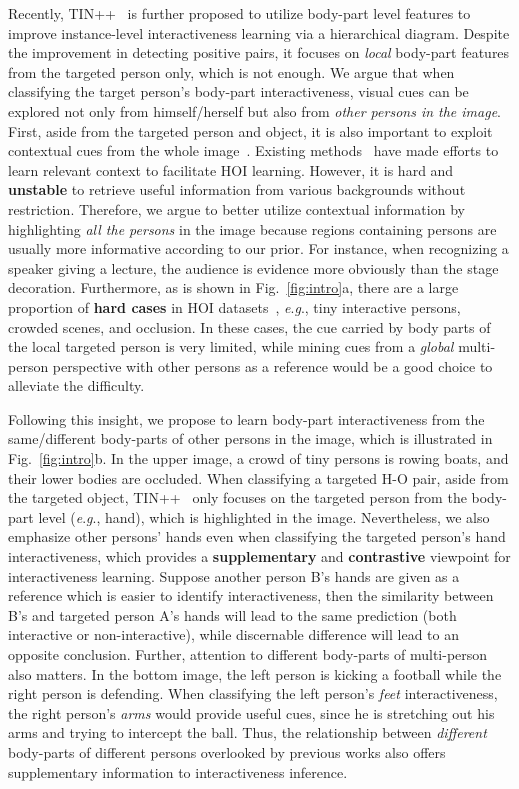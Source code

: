 \documentclass[runningheads]{llncs}
\newcommand{\eg}{\textit{e}.\textit{g}.}
\begin{document}
Recently, TIN++~\cite{li2021transferable} is further proposed to utilize body-part level features to improve instance-level interactiveness learning via a hierarchical diagram. Despite the improvement in detecting positive pairs, it focuses on \textit{local} body-part features from the targeted person only, which is not enough. We argue that when classifying the target person's body-part interactiveness, visual cues can be explored not only from himself/herself but also from \textit{other persons in the image}. 
First, aside from the targeted person and object, it is also important to exploit contextual cues from the whole image~\cite{gao2018ican}. 
Existing methods~\cite{gao2018ican,qpic} have made efforts to learn relevant context to facilitate HOI learning.
However, it is hard and \textbf{unstable} to retrieve useful information from various backgrounds without restriction. Therefore, we argue to better utilize contextual information by highlighting \textit{all the persons} in the image because regions containing persons are usually more informative according to our prior. For instance, when recognizing a speaker giving a lecture, the audience is evidence more obviously than the stage decoration.
Furthermore, as is shown in Fig.~\ref{fig:intro}a, there are a large proportion of \textbf{hard cases} in HOI datasets~\cite{hicodet}, \eg, tiny interactive persons, crowded scenes, and occlusion. In these cases, the cue carried by body parts of the local targeted person is very limited,
while mining cues from a \textit{global} multi-person perspective with other persons as a reference would be a good choice to alleviate the difficulty. 

Following this insight, we propose to learn body-part interactiveness from the same/different body-parts of other persons in the image, which is illustrated in Fig.~\ref{fig:intro}b.
In the upper image, a crowd of tiny persons is rowing boats, and their lower bodies are occluded. When classifying a targeted H-O pair, 
aside from the targeted object, 
TIN++~\cite{li2021transferable} only focuses on the targeted person from the body-part level (\eg, hand), which is highlighted in the image. 
Nevertheless, we also emphasize other persons' hands even when classifying the targeted person's hand interactiveness, which provides a \textbf{supplementary} and \textbf{contrastive} viewpoint for interactiveness learning. 
Suppose another person B's hands are given as a reference which is easier to identify interactiveness, then the similarity between B's and targeted person A's hands will lead to the same prediction (both interactive or non-interactive), while discernable difference will lead to an opposite conclusion.
Further, attention to different body-parts of multi-person also matters. In the bottom image, the left person is kicking a football while the right person is defending. When classifying the left person's \textit{feet} interactiveness, the right person's \textit{arms} would provide useful cues, since he is stretching out his arms and trying to intercept the ball. Thus, the relationship between \textit{different} body-parts of different persons overlooked by previous works also offers supplementary information to interactiveness inference.
\end{document}
